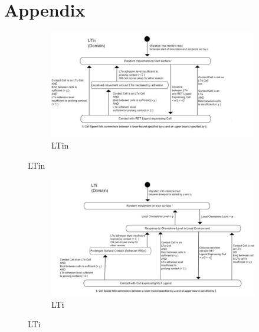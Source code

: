 \documentclass{UoYCSproject}
\begin{document}
\printbibliography
\chapter{Appendix}

\begin{figure}[htp]
\centering
\begin{subfigure}{0.95\textwidth}
\centering
\includegraphics[width=\textwidth]{Appendix/Models/Domain/LTin}
\caption{LTin}
\end{subfigure}
\end{figure}

\begin{figure}[htp]\ContinuedFloat
\centering
\begin{subfigure}{0.95\textwidth}
\centering
\includegraphics[width=\textwidth]{Appendix/Models/Domain/LTi}
\caption{LTi}
\end{subfigure}
\end{figure}
\end{document}

